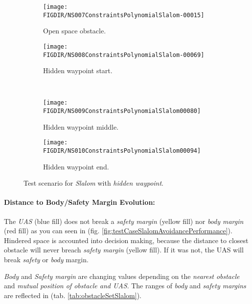 \begin{figure}[H]
    \centering
    \begin{subfigure}{0.48\textwidth}
    	\centering
        \texttt{[image: \\FIGDIR/NS007ConstraintsPolynomialSlalom-00015]}
        \caption{Open space obstacle.}
        \label{fig:slalomOpenSpaceObstacle}
    \end{subfigure}
    \begin{subfigure}{0.48\textwidth}
    	\centering
        \texttt{[image: \\FIGDIR/NS008ConstraintsPolynomialSlalom-00069]} 
        \caption{Hidden waypoint start.}
        \label{fig:slalomHiddenWaypointStart}
    \end{subfigure}
    \\
    \begin{subfigure}{0.48\textwidth}
	    \centering
        \texttt{[image: \\FIGDIR/NS009ConstraintsPolynomialSlalom00080]} 
        \caption{Hidden waypoint middle.}
        \label{fig:slalomHiddenWaypointMiddle}
    \end{subfigure}
    \begin{subfigure}{0.48\textwidth}
    	\centering
        \texttt{[image: \\FIGDIR/NS010ConstraintsPolynomialSlalom00094]} 
        \caption{Hidden waypoint end.}
        \label{fig:slalomHiddenWaypointEnd}
    \end{subfigure}
    \caption{Test scenario for \emph{Slalom} with \emph{hidden waypoint}. }
    \label{fig:testCaseSlalomwithHiddenWaypoint}
\end{figure}


\newpage
\paragraph{Distance to Body/Safety Margin Evolution:} The \emph{UAS} (blue fill) does not break a \emph{safety margin} (yellow fill) nor \emph{body margin} (red fill) as you can seen in (fig. \ref{fig:testCaseSlalomAvoidancePerformance}). Hindered space is accounted into decision making, because the distance to closest obstacle will never breach \emph{safety margin} (yellow fill). If it was not, the UAS will break \emph{safety} or \emph{body} margin. 

\emph{Body} and \emph{Safety margin} are changing values depending on the \emph{nearest obstacle} and \emph{mutual position of obstacle and UAS}. The ranges of \emph{body} and \emph{safety margins} are reflected in (tab. \ref{tab:obstacleSetSlalom}). 

